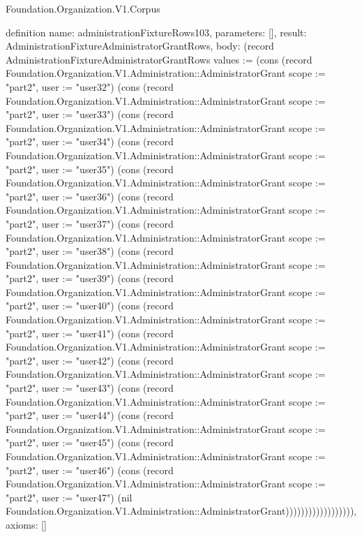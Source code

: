 \begin{lexlean}{Foundation.Organization.V1.Corpus}
\begin{semanticmodule}
definition{
  name: administrationFixtureRows103,
  parameters: [],
  result: AdministrationFixtureAdministratorGrantRows,
  body: (record AdministrationFixtureAdministratorGrantRows {values := (cons (record Foundation.Organization.V1.Administration::AdministratorGrant {scope := "part2", user := "user32"}) (cons (record Foundation.Organization.V1.Administration::AdministratorGrant {scope := "part2", user := "user33"}) (cons (record Foundation.Organization.V1.Administration::AdministratorGrant {scope := "part2", user := "user34"}) (cons (record Foundation.Organization.V1.Administration::AdministratorGrant {scope := "part2", user := "user35"}) (cons (record Foundation.Organization.V1.Administration::AdministratorGrant {scope := "part2", user := "user36"}) (cons (record Foundation.Organization.V1.Administration::AdministratorGrant {scope := "part2", user := "user37"}) (cons (record Foundation.Organization.V1.Administration::AdministratorGrant {scope := "part2", user := "user38"}) (cons (record Foundation.Organization.V1.Administration::AdministratorGrant {scope := "part2", user := "user39"}) (cons (record Foundation.Organization.V1.Administration::AdministratorGrant {scope := "part2", user := "user40"}) (cons (record Foundation.Organization.V1.Administration::AdministratorGrant {scope := "part2", user := "user41"}) (cons (record Foundation.Organization.V1.Administration::AdministratorGrant {scope := "part2", user := "user42"}) (cons (record Foundation.Organization.V1.Administration::AdministratorGrant {scope := "part2", user := "user43"}) (cons (record Foundation.Organization.V1.Administration::AdministratorGrant {scope := "part2", user := "user44"}) (cons (record Foundation.Organization.V1.Administration::AdministratorGrant {scope := "part2", user := "user45"}) (cons (record Foundation.Organization.V1.Administration::AdministratorGrant {scope := "part2", user := "user46"}) (cons (record Foundation.Organization.V1.Administration::AdministratorGrant {scope := "part2", user := "user47"}) (nil Foundation.Organization.V1.Administration::AdministratorGrant)))))))))))))))))}),
  axioms: []
}


\end{semanticmodule}
\end{lexlean}
